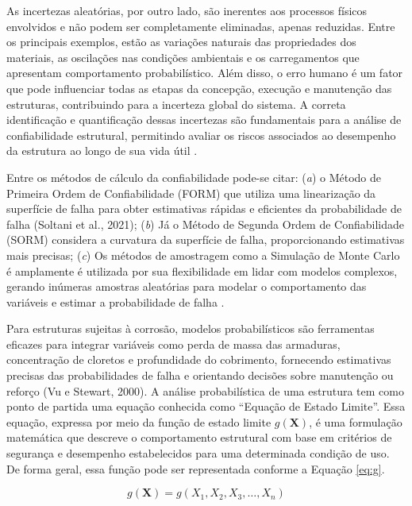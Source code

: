 As incertezas aleatórias, por outro lado, são inerentes aos processos físicos envolvidos e não podem ser completamente eliminadas, apenas reduzidas. Entre os principais exemplos, estão as variações naturais das propriedades dos materiais, as oscilações nas condições ambientais e os carregamentos que apresentam comportamento probabilístico. Além disso, o erro humano é um fator que pode influenciar todas as etapas da concepção, execução e manutenção das estruturas, contribuindo para a incerteza global do sistema. A correta identificação e quantificação dessas incertezas são fundamentais para a análise de confiabilidade estrutural, permitindo avaliar os riscos associados ao desempenho da estrutura ao longo de sua vida útil \cite{du_structural_2023}.

Entre os métodos de cálculo da confiabilidade pode-se citar: (\textit{a}) o Método de Primeira Ordem de Confiabilidade (FORM) que utiliza uma linearização da superfície de falha para obter estimativas rápidas e eficientes da probabilidade de falha (Soltani et al., 2021); (\textit{b}) Já o Método de Segunda Ordem de Confiabilidade (SORM) considera a curvatura da superfície de falha, proporcionando estimativas mais precisas; (\textit{c}) Os métodos de amostragem como a Simulação de Monte Carlo é amplamente é utilizada por sua flexibilidade em lidar com modelos complexos, gerando inúmeras amostras aleatórias para modelar o comportamento das variáveis e estimar a probabilidade de falha \cite{pereira_junior_reliability_2023}.

 Para estruturas sujeitas à corrosão, modelos probabilísticos são ferramentas eficazes para integrar variáveis como perda de massa das armaduras, concentração de cloretos e profundidade do cobrimento, fornecendo estimativas precisas das probabilidades de falha e orientando decisões sobre manutenção ou reforço (Vu e Stewart, 2000). A análise probabilística de uma estrutura tem como ponto de partida uma equação conhecida como “Equação de Estado Limite”. Essa equação, expressa por meio da função de estado limite $g(\mathbf{X})$, é uma formulação matemática que descreve o comportamento estrutural com base em critérios de segurança e desempenho estabelecidos para uma determinada condição de uso. De forma geral, essa função pode ser representada conforme a Equação \eqref{eq:g}.

\begin{equation}\label{eq:g}
g(\mathbf{X}) = g(X_1, X_2, X_3, \dots, X_n)
\end{equation} 

